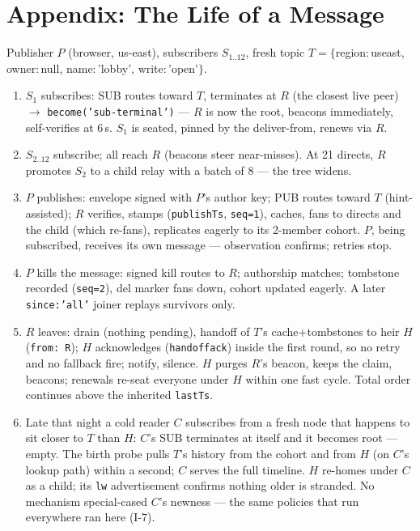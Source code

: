 \documentclass[nobib]{tufte-handout}
\begin{document}
\section{Appendix: The Life of a Message}

Publisher $P$ (browser, us-east), subscribers $S_{1..12}$, fresh topic
$T=\{$region:\,useast, owner:\,null, name:\,'lobby', write:\,'open'$\}$.

\begin{enumerate}
\item $S_1$ subscribes: SUB routes toward $T$, terminates at $R$ (the
  closest live peer) $\rightarrow$ \texttt{become('sub-terminal')} ---
  $R$ is now the root, beacons immediately, self-verifies at 6\,s.
  $S_1$ is seated, pinned by the deliver-from, renews via $R$.
\item $S_{2..12}$ subscribe; all reach $R$ (beacons steer near-misses).
  At 21 directs, $R$ promotes $S_2$ to a child relay with a batch of 8
  --- the tree widens.
\item $P$ publishes: envelope signed with $P$'s author key; PUB routes
  toward $T$ (hint-assisted); $R$ verifies, stamps
  (\texttt{publishTs}, \texttt{seq=1}), caches, fans to directs and the
  child (which re-fans), replicates eagerly to its 2-member cohort.
  $P$, being subscribed, receives its own message --- observation
  confirms; retries stop.
\item $P$ kills the message: signed kill routes to $R$; authorship
  matches; tombstone recorded (\texttt{seq=2}), del marker fans down,
  cohort updated eagerly. A later \texttt{since:'all'} joiner replays
  survivors only.
\item $R$ leaves: drain (nothing pending), handoff of $T$'s
  cache+tombstones to heir $H$ (\texttt{from:\,R}); $H$ acknowledges
  (\texttt{handoffack}) inside the first round, so no retry and no
  fallback fire; notify, silence. $H$ purges $R$'s beacon, keeps the
  claim, beacons; renewals re-seat everyone under $H$ within one fast
  cycle. Total order continues above the inherited \texttt{lastTs}.
\item Late that night a cold reader $C$ subscribes from a fresh node
  that happens to sit closer to $T$ than $H$: $C$'s SUB terminates at
  itself and it becomes root --- empty. The birth probe pulls $T$'s
  history from the cohort and from $H$ (on $C$'s lookup path) within a
  second; $C$ serves the full timeline. $H$ re-homes under $C$ as a
  child; its \texttt{lw} advertisement confirms nothing older is
  stranded. No mechanism special-cased $C$'s newness --- the same
  policies that run everywhere ran here (I-7).
\end{enumerate}
\end{document}
